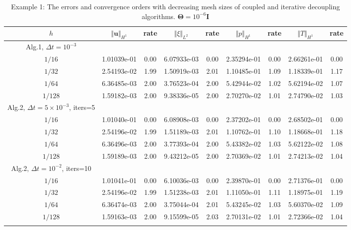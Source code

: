\documentclass{article}
\numberwithin{equation}{section}
\begin{document}
\begin{table}[htbp]\tiny 
\caption{Example 1: The errors and convergence orders with decreasing mesh sizes of
 coupled and iterative decoupling algorithms. $ \bm\Theta=10^{-6}\bm{I}$ }
\centering
\begin{tabular}{ccccccccc}
\toprule
  $h$&$\Vert\bm u\Vert_{H^1}$ &rate &$\Vert\xi\Vert_{L^2}$ &rate &$\Vert p\Vert_{H^1}$ &rate&$\Vert T\Vert_{H^1}$ &rate \\ 
\midrule
Alg.1, $\Delta t=10^{-3}$\\
\midrule
$1/16$ & 1.01039e-01 & 0.00 & 6.07933e-03 & 0.00 & 2.35294e-01 & 0.00 & 2.66261e-01 & 0.00 \\
$1/32$ & 2.54193e-02 & 1.99 & 1.50919e-03 & 2.01 & 1.10485e-01 & 1.09 & 1.18339e-01 & 1.17 \\
$1/64$ & 6.36485e-03 & 2.00 & 3.76523e-04 & 2.00 & 5.42944e-02 & 1.02 & 5.62194e-02 & 1.07 \\
$1/128$ & 1.59182e-03 & 2.00 & 9.38336e-05 & 2.00 & 2.70270e-02 & 1.01 & 2.74790e-02 & 1.03 \\
\midrule
Alg.2, $\Delta t=5\times 10^{-3}$, iters=5 &\\
\midrule
$1/16$ & 1.01040e-01 & 0.00 & 6.08908e-03 & 0.00 & 2.37202e-01 & 0.00 & 2.68502e-01 & 0.00 \\
$1/32$ & 2.54196e-02 & 1.99 & 1.51189e-03 & 2.01 & 1.10762e-01 & 1.10 & 1.18668e-01 & 1.18 \\
$1/64$ & 6.36496e-03 & 2.00 & 3.77393e-04 & 2.00 & 5.43382e-02 & 1.03 & 5.62122e-02 & 1.08 \\
$1/128$ & 1.59189e-03 & 2.00 & 9.43212e-05 & 2.00 & 2.70369e-02 & 1.01 & 2.74213e-02 & 1.04 \\
\midrule
Alg.2, $\Delta t=10^{-2}$, iters=10 &\\
\midrule
$1/16$ & 1.01041e-01 & 0.00 & 6.10036e-03 & 0.00 & 2.39870e-01 & 0.00 & 2.71376e-01 & 0.00 \\
$1/32$ & 2.54196e-02 & 1.99 & 1.51238e-03 & 2.01 & 1.11050e-01 & 1.11 & 1.18975e-01 & 1.19 \\
$1/64$ & 6.36474e-03 & 2.00 & 3.75044e-04 & 2.01 & 5.43245e-02 & 1.03 & 5.60370e-02 & 1.09 \\
$1/128$ & 1.59163e-03 & 2.00 & 9.15599e-05 & 2.03 & 2.70131e-02 & 1.01 & 2.72366e-02 & 1.04 \\
\bottomrule
\label{tab:Theta 1e-6}   
\end{tabular}
\end{table} 
\end{document}
